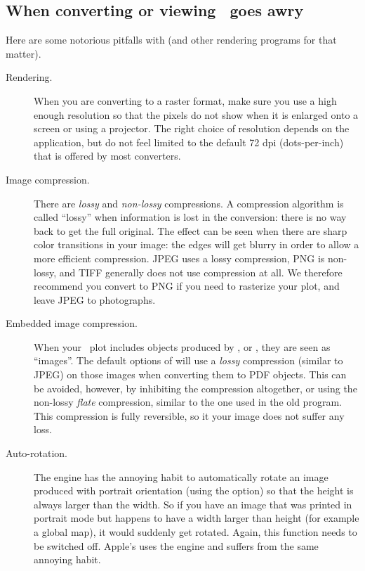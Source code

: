 \subsection{When converting or viewing \PS\ goes awry}
Here are some notorious pitfalls with  (and other rendering programs for that matter).
\begin{description}
\item[Rendering.] When you are converting to a raster format, make sure you use a high enough resolution so that the pixels do not show when it is enlarged onto a screen or using a projector. The right choice of resolution depends on the application, but do not feel limited to the default 72 dpi (dots-per-inch) that is offered by most converters.

\item[Image compression.] There are \emph{lossy} and \emph{non-lossy} compressions. A compression algorithm is called ``lossy'' when information is lost in the conversion: there is no way back to get the full original. The effect can be seen when there are sharp color transitions in your image: the edges will get blurry in order to allow a more efficient compression. JPEG uses a lossy compression, PNG is non-lossy, and TIFF generally does not use compression at all. We therefore recommend you convert to PNG if you need to rasterize your plot, and leave JPEG to photographs.

\item[Embedded image compression.] When your \GMT\ plot includes objects produced by ,  or , they are seen as ``images''. The default options of  will use a \emph{lossy} compression (similar to JPEG) on those images when converting them to PDF objects. This can be avoided, however, by inhibiting the compression altogether, or using the non-lossy \emph{flate} compression, similar to the one used in the old  program. This compression is fully reversible, so it your image does not suffer any loss.

\item[Auto-rotation.] The  engine has the annoying habit to automatically rotate an image produced with portrait orientation (using the  option) so that the height is always larger than the width. So if you have an image that was printed in portrait mode but happens to have a width larger than height (for example a global map), it would suddenly get rotated. Again, this function needs to be switched off. Apple's  uses the  engine and suffers from the same annoying habit.


\end{description}
